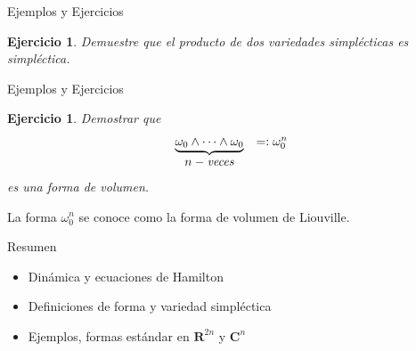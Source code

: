 \documentclass{beamer}
\newcounter{Ejercicio}
\newtheorem{Ejercicio}[theorem]{Ejercicio}%
\begin{document}

\begin{frame}{Ejemplos y Ejercicios}

\begin{Ejercicio}
Demuestre que el producto de dos variedades simpl\'ecticas es simpl\'ectica. 
\end{Ejercicio}

\end{frame}


\begin{frame}{Ejemplos y Ejercicios}

\begin{Ejercicio}
 Demostrar que $$\begin{array}{cc}                             
\underbrace{\omega_0\wedge \cdots \wedge \omega_0} & =: \omega_0^{n}
 \\ n-{\it veces} &
\end{array}$$ es una forma de volumen.
\end{Ejercicio}

\vfill
        \pause
%        
La forma $\omega_0^{n}$ se conoce como la forma de volumen de Liouville.
\end{frame}


\begin{frame}{Resumen}

\begin{itemize}
\item Dinámica y ecuaciones de Hamilton
\pause \vfill
\item Definiciones de forma y variedad simpléctica 
\pause \vfill
\item Ejemplos, formas estándar en ${\mathbf R}^{2n}$ y ${\mathbf C}^{n}$

\end{itemize}

\end{frame}




%
%
%
%


%
%
%


%
%
%
%
%
%
%
%
\end{document}
